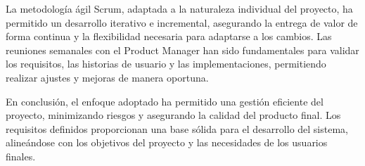 La metodología ágil Scrum, adaptada a la naturaleza individual del proyecto, ha permitido un desarrollo iterativo e incremental, asegurando la entrega de valor de forma continua y la flexibilidad necesaria para adaptarse a los cambios. Las reuniones semanales con el Product Manager han sido fundamentales para validar los requisitos, las historias de usuario y las implementaciones, permitiendo realizar ajustes y mejoras de manera oportuna.

En conclusión, el enfoque adoptado ha permitido una gestión eficiente del proyecto, minimizando riesgos y asegurando la calidad del producto final. Los requisitos definidos proporcionan una base sólida para el desarrollo del sistema, alineándose con los objetivos del proyecto y las necesidades de los usuarios finales.